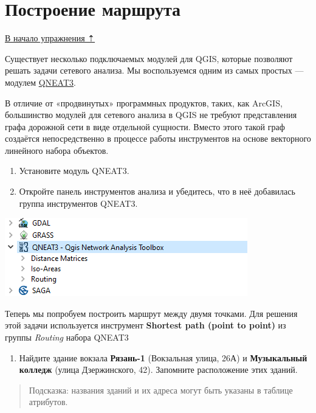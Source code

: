 \documentclass[
  12pt,
]{book}
\providecommand{\tightlist}{%
  \setlength{\itemsep}{0pt}\setlength{\parskip}{0pt}}
\begin{document}
\hypertarget{networks-route}{%
\section{Построение маршрута}\label{networks-route}}

\protect\hyperlink{networks}{В начало упражнения ⇡}

Существует несколько подключаемых модулей для QGIS, которые позволяют решать задачи сетевого анализа. Мы воспользуемся одним из самых простых --- модулем \href{https://root676.github.io/}{QNEAT3}.

В отличие от «продвинутых» программных продуктов, таких, как ArcGIS, большинство модулей для сетевого анализа в QGIS не требуют представления графа дорожной сети в виде отдельной сущности. Вместо этого такой граф создаётся непосредственно в процессе работы инструментов на основе векторного линейного набора объектов.

\begin{enumerate}
\def\labelenumi{\arabic{enumi}.}
\item
  Установите модуль QNEAT3.
\item
  Откройте панель инструментов анализа и убедитесь, что в неё добавилась группа инструментов QNEAT3.
\end{enumerate}

\includegraphics{images/Ex11_RoadNetwork/qneat3_instruments.png}

Теперь мы попробуем построить маршрут между двумя точками. Для решения этой задачи используется инструмент \textbf{Shortest path (point to point)} из группы \emph{Routing} набора QNEAT3

\begin{enumerate}
\def\labelenumi{\arabic{enumi}.}
\setcounter{enumi}{2}
\tightlist
\item
  Найдите здание вокзала \textbf{Рязань-1} (Вокзальная улица, 26А) и \textbf{Музыкальный колледж} (улица Дзержинского, 42). Запомните расположение этих зданий.
\end{enumerate}

\begin{quote}
Подсказка: названия зданий и их адреса могут быть указаны в таблице атрибутов.
\end{quote}
\end{document}
